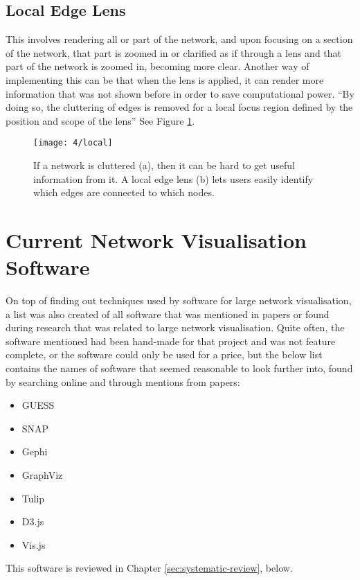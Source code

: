 \documentclass[../dissertation.tex]{subfiles}
\begin{document}
\subsection{Local Edge Lens}

This involves rendering all or part of the network, and upon focusing on a section of the network, that part is zoomed in or clarified as if through a lens and that part of the network is zoomed in, becoming more clear. Another way of implementing this can be that when the lens is applied, it can render more information that was not shown before in order to save computational power. ``By doing so, the cluttering of edges is removed for a local focus region defined by the position and scope of the lens'' \cite{tominski2006fisheye} See Figure \ref{fig:local}.
\begin{figure}[htb]
    \centering
    \texttt{[image: 4/local]}
    \caption{If a network is cluttered (a), then it can be hard to get useful information from it. A local edge lens (b) lets users easily identify which edges are connected to which nodes. \cite{tominski2006fisheye}}
    \label{fig:local}
\end{figure}

\section{Current Network Visualisation Software}

On top of finding out techniques used by software for large network visualisation, a list was also created of all software that was mentioned in papers or found during research that was related to large network visualisation. Quite often, the software mentioned had been hand-made for that project and was not feature complete, or the software could only be used for a price, but the below list contains the names of software that seemed reasonable to look further into, found by searching online and through mentions from papers:
\begin{itemize}
    \item GUESS \cite{guess}
    \item SNAP \cite{snap}
    \item Gephi \cite{gephi}
    \item GraphViz \cite{graphviz}
    \item Tulip \cite{tulip}
    \item D3.js \cite{d3}
    \item Vis.js \cite{vis}
\end{itemize}

This software is reviewed in Chapter \ref{sec:systematic-review}, below.
\end{document}
